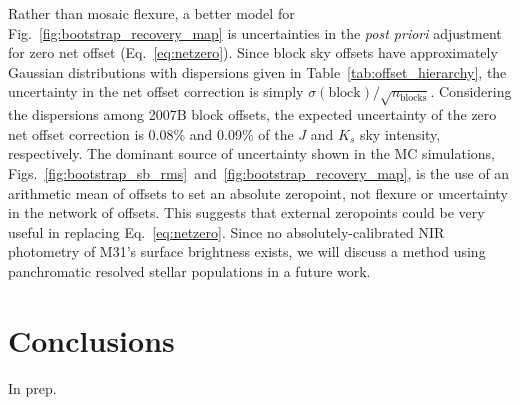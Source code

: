 \documentclass[iop]{emulateapj}
\newcommand{\todo}[1]{\textcolor{RedOrange}{#1}} %
\newcommand{\Fig}[1]{Fig.~\ref{fig:#1}}  %
\newcommand{\Eq}[1]{Eq.~\ref{eq:#1}}  %
\newcommand{\Tab}[1]{Table~\ref{tab:#1}}  %
\begin{document}
Rather than mosaic flexure, a better model for \Fig{bootstrap_recovery_map} is uncertainties in the \textit{post priori} adjustment for zero net offset (\Eq{netzero}).
Since block sky offsets have approximately Gaussian distributions with dispersions given in \Tab{offset_hierarchy}, the uncertainty in the net offset correction is simply $\sigma(\mathrm{block})/\sqrt{n_\mathrm{blocks}}$.
Considering the dispersions among 2007B block offsets, the expected uncertainty of the zero net offset correction is 0.08\% and 0.09\% of the $J$ and $K_s$ sky intensity, respectively.
The dominant source of uncertainty shown in the MC simulations, Figs.~\ref{fig:bootstrap_sb_rms}~and~\ref{fig:bootstrap_recovery_map}, is the use of an arithmetic mean of offsets to set an absolute zeropoint, not flexure or uncertainty in the network of offsets.
This suggests that external zeropoints could be very useful in replacing \Eq{netzero}. Since no absolutely-calibrated NIR photometry of M31's surface brightness exists, we will discuss a method using panchromatic resolved stellar populations in a future work.

\section{Conclusions}
\label{sec:conclusions}

\todo{In prep.}


\end{document}
